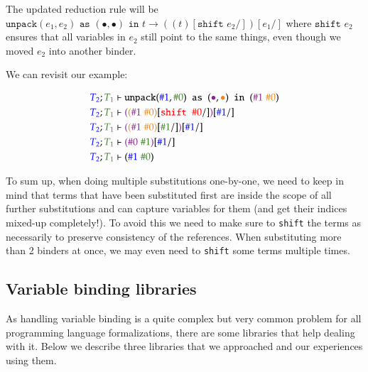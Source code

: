 \documentclass[runningheads]{article}
\begin{document}
The updated reduction rule will be $\texttt{unpack} (e_1, e_2) \texttt{ as } (\bullet, \bullet) \texttt{ in } t \longrightarrow ((t)[\texttt{shift }e_2/])[e_1/]$ where $\texttt{shift }e_2$ ensures that all variables in $e_2$ still point to the same things, even though we moved $e_2$ into another binder.

We can revisit our example:

\begin{align*}
{\color{blue}T_2}; {\color{OliveGreen}T_1} &\vdash \texttt{unpack} ({\color{blue}\#1}, {\color{OliveGreen}\#0}) \texttt{ as } ({\color{Fuchsia}\bullet}, {\color{BurntOrange}\bullet}) \texttt{ in } ({\color{Fuchsia}\#1} \; {\color{BurntOrange}\#0}) \\
{\color{blue}T_2}; {\color{OliveGreen}T_1} &\vdash {\color{Fuchsia}(}{\color{BurntOrange}({\color{Fuchsia}\#1} \; {\color{BurntOrange}\#0})}[{\color{red}\texttt{shift }\#0}/]{\color{Fuchsia})}[{\color{blue}\#1}/] \\
{\color{blue}T_2}; {\color{OliveGreen}T_1} &\vdash {\color{Fuchsia}(}{\color{BurntOrange}({\color{Fuchsia}\#1} \; {\color{BurntOrange}\#0})}[{\color{OliveGreen}\#1}/]{\color{Fuchsia})}[{\color{blue}\#1}/] \\
{\color{blue}T_2}; {\color{OliveGreen}T_1} &\vdash {\color{Fuchsia}(}{\color{Fuchsia}\#0} \; {\color{OliveGreen}\#1}{\color{Fuchsia})}[{\color{blue}\#1}/] \\
{\color{blue}T_2}; {\color{OliveGreen}T_1} &\vdash ({\color{blue}\#1} \; {\color{OliveGreen}\#0})
\end{align*}

To sum up, when doing multiple substitutions one-by-one, we need to keep in mind that terms that have been substituted first are inside the scope of all further substitutions and can capture variables for them (and get their indices mixed-up completely!). To avoid this we need to make sure to \texttt{shift} the terms as necessarily to preserve consistency of the references. When substituting more than 2 binders at once, we may even need to \texttt{shift} some terms multiple times.

\subsection{Variable binding libraries}
\label{binderlibs}

As handling variable binding is a quite complex but very common problem for all programming language formalizations, there are some libraries that help dealing with it. Below we describe three libraries that we approached and our experiences using them.
\end{document}
